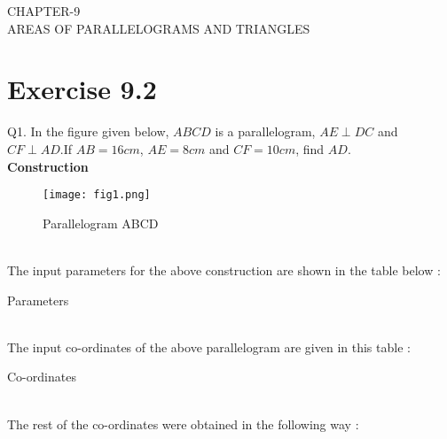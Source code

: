 \documentclass{article}
\begin{document}
\begin{center}
        \textbf\large{CHAPTER-9 \\ AREAS OF PARALLELOGRAMS AND TRIANGLES}
\end{center}
\section{Exercise 9.2}
Q1. In the figure given below, $ABCD$ is a parallelogram, $AE \perp DC$ and $CF \perp AD$.If $AB = 16cm$, $AE = 8cm$ and $CF = 10cm$, find $AD$.\\
\textbf{Construction}\\
\begin{figure}[h]
 \begin{center}
  \texttt{[image: fig1.png]}
 \end{center}
 \caption{Parallelogram ABCD}
 \label{fig:Fig}
\end{figure}\\
\pagebreak
The input parameters for the above construction are shown in the table below : \\
\begin{table}[h]
	\centering
	
	\caption{Parameters}
	\label{tab:table1}
\end{table}\\
The input co-ordinates of the above parallelogram are given in this table : \\
\begin{table}[h]
	\centering
	
	\caption{Co-ordinates}
	\label{tab:table2}
\end{table}\\
The rest of the co-ordinates were obtained in the following way : \\
\end{document}
